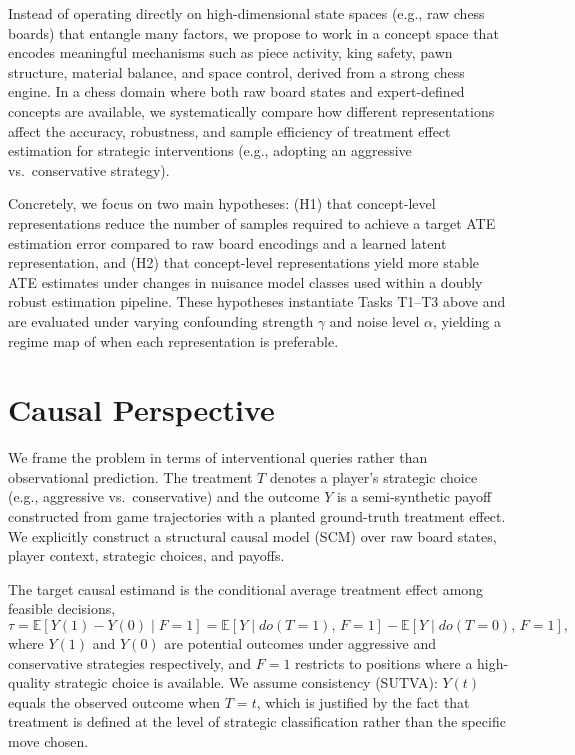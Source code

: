 \documentclass[11pt]{article}
\begin{document}
Instead of operating directly on high-dimensional state spaces (e.g., raw chess
boards) that entangle many factors, we propose to work in a concept space that
encodes meaningful mechanisms such as piece activity, king safety, pawn structure,
material balance, and space control, derived from a strong chess engine.\cite{lemeire2005causalmodelsinchess,stockfish}
In a chess domain where both raw board states and expert-defined concepts are
available, we systematically compare how different representations affect the
accuracy, robustness, and sample efficiency of treatment effect estimation for
strategic interventions (e.g., adopting an aggressive vs.\ conservative
strategy).\cite{chernozhukov2018double,scholkopf2021towards}

Concretely, we focus on two main hypotheses: (H1) that concept-level
representations reduce the number of samples required to achieve a target ATE
estimation error compared to raw board encodings and a learned latent
representation, and (H2) that concept-level representations yield more stable ATE
estimates under changes in nuisance model classes used within a doubly robust
estimation pipeline. These hypotheses instantiate Tasks T1--T3 above and are
evaluated under varying confounding strength $\gamma$ and noise level $\alpha$,
yielding a regime map of when each representation is preferable.

\section*{Causal Perspective}

We frame the problem in terms of interventional queries rather than observational
prediction.\cite{pearl2009causality} The treatment $T$ denotes a player's strategic
choice (e.g., aggressive vs.\ conservative) and the outcome $Y$ is a semi-synthetic
payoff constructed from game trajectories with a planted ground-truth treatment
effect.\cite{hill2011bayesian} We explicitly construct a structural causal model
(SCM) over raw board states, player context, strategic choices, and payoffs.

The target causal estimand is the conditional average treatment effect among
feasible decisions,
\[
\tau = \mathbb{E}[Y(1) - Y(0) \mid F = 1]
    = \mathbb{E}[Y \mid do(T=1),\, F=1] - \mathbb{E}[Y \mid do(T=0),\, F=1],
\]
where $Y(1)$ and $Y(0)$ are potential outcomes under aggressive and conservative
strategies respectively, and $F=1$ restricts to positions where a high-quality
strategic choice is available. We assume consistency (SUTVA): $Y(t)$ equals the
observed outcome when $T=t$, which is justified by the fact that treatment is
defined at the level of strategic classification rather than the specific move
chosen.\cite{pearl2009causality,hill2011bayesian}
\end{document}

